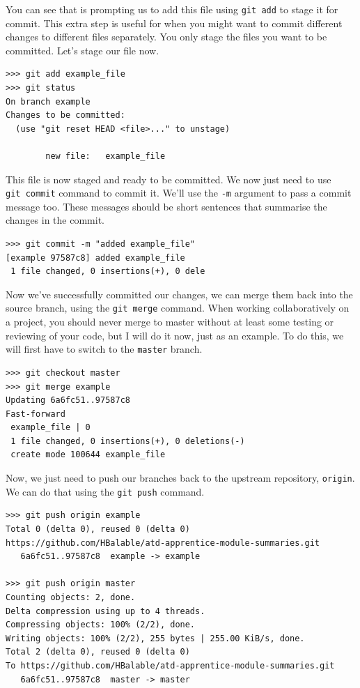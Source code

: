 You can see that is prompting us to add this file using \texttt{git\ add} to stage it for commit. This extra step is useful for when you might want to commit different changes to different files separately. You only stage the files you want to be committed. Let's stage our file now.

\begin{verbatim}
>>> git add example_file
>>> git status
On branch example
Changes to be committed:
  (use "git reset HEAD <file>..." to unstage)

        new file:   example_file
\end{verbatim}

This file is now staged and ready to be committed. We now just need to use \texttt{git\ commit} command to commit it. We'll use the \texttt{-m} argument to pass a commit message too. These messages should be short sentences that summarise the changes in the commit.

\begin{verbatim}
>>> git commit -m "added example_file"
[example 97587c8] added example_file
 1 file changed, 0 insertions(+), 0 dele
\end{verbatim}

Now we've successfully committed our changes, we can merge them back into the source branch, using the \texttt{git\ merge} command. When working collaboratively on a project, you should never merge to master without at least some testing or reviewing of your code, but I will do it now, just as an example. To do this, we will first have to switch to the \texttt{master} branch.

\begin{verbatim}
>>> git checkout master
>>> git merge example
Updating 6a6fc51..97587c8
Fast-forward
 example_file | 0
 1 file changed, 0 insertions(+), 0 deletions(-)
 create mode 100644 example_file
\end{verbatim}

Now, we just need to push our branches back to the upstream repository, \texttt{origin}. We can do that using the \texttt{git\ push} command.


\pagebreak

\begin{verbatim}
>>> git push origin example
Total 0 (delta 0), reused 0 (delta 0)
https://github.com/HBalable/atd-apprentice-module-summaries.git
   6a6fc51..97587c8  example -> example  

>>> git push origin master
Counting objects: 2, done.
Delta compression using up to 4 threads.
Compressing objects: 100% (2/2), done.
Writing objects: 100% (2/2), 255 bytes | 255.00 KiB/s, done.
Total 2 (delta 0), reused 0 (delta 0)
To https://github.com/HBalable/atd-apprentice-module-summaries.git
   6a6fc51..97587c8  master -> master
\end{verbatim}

